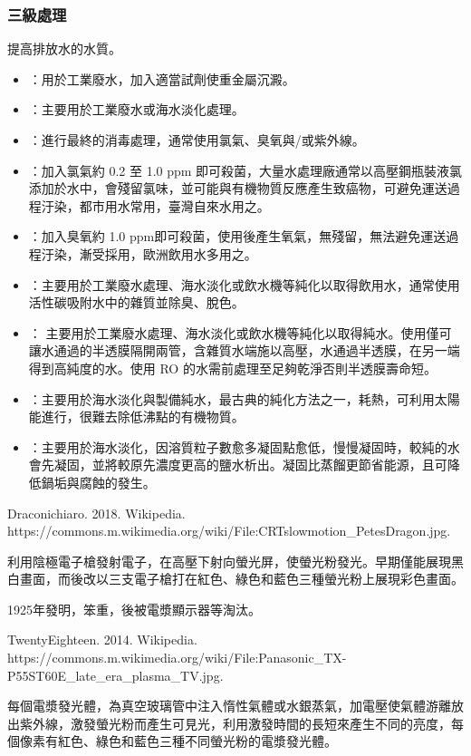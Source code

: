 \documentclass[a4paper,12pt]{report}
\begin{document}
\begin{itemize}
\begin{itemize}
\subsubsection{三級處理}
提高排放水的水質。
\begin{itemize}
\item {}：用於工業廢水，加入適當試劑使重金屬沉澱。
\item {}：主要用於工業廢水或海水淡化處理。
\item {}：進行最終的消毒處理，通常使用氯氣、臭氧與/或紫外線。
\bit
\item {}：加入氯氣約 0.2 至 1.0 ppm 即可殺菌，大量水處理廠通常以高壓鋼瓶裝液氯添加於水中，會殘留氯味，並可能與有機物質反應產生致癌物，可避免運送過程汙染，都市用水常用，臺灣自來水用之。
\item {}：加入臭氧約 1.0 ppm即可殺菌，使用後產生氧氣，無殘留，無法避免運送過程汙染，漸受採用，歐洲飲用水多用之。
\eit
\item {}：主要用於工業廢水處理、海水淡化或飲水機等純化以取得飲用水，通常使用活性碳吸附水中的雜質並除臭、脫色。
\item {}： 主要用於工業廢水處理、海水淡化或飲水機等純化以取得純水。使用僅可讓水通過的半透膜隔開兩管，含雜質水端施以高壓，水通過半透膜，在另一端得到高純度的水。使用 RO 的水需前處理至足夠乾淨否則半透膜壽命短。
\item {}：主要用於海水淡化與製備純水，最古典的純化方法之一，耗熱，可利用太陽能進行，很難去除低沸點的有機物質。
\item {}：主要用於海水淡化，因溶質粒子數愈多凝固點愈低，慢慢凝固時，較純的水會先凝固，並將較原先濃度更高的鹽水析出。凝固比蒸餾更節省能源，且可降低鍋垢與腐蝕的發生。
\end{itemize}
\bct\bfH\ctr{}\caption{Draconichiaro. 2018. Wikipedia.
\\https://commons.m.wikimedia.org/wiki/File:CRTslowmotion\_PetesDragon.jpg.}\ef\FB\ect
利用陰極電子槍發射電子，在高壓下射向螢光屏，使螢光粉發光。早期僅能展現黑白畫面，而後改以三支電子槍打在紅色、綠色和藍色三種螢光粉上展現彩色畫面。

1925年發明，笨重，後被電漿顯示器等淘汰。
\bct\bfH\ctr{}\caption{TwentyEighteen. 2014. Wikipedia. https://commons.m.wikimedia.org/wiki/File:Panasonic\_TX-P55ST60E\_late\_era\_plasma\_TV.jpg.}\ef\FB\ect
每個電漿發光體，為真空玻璃管中注入惰性氣體或水銀蒸氣，加電壓使氣體游離放出紫外線，激發螢光粉而產生可見光，利用激發時間的長短來產生不同的亮度，每個像素有紅色、綠色和藍色三種不同螢光粉的電漿發光體。


\end{itemize}
\end{itemize}
\end{document}
